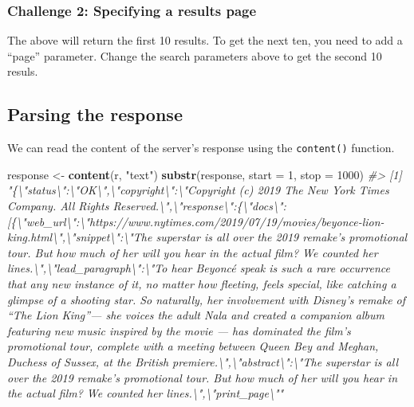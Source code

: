 \documentclass[]{book}
\newenvironment{Shaded}{\begin{snugshade}}{\end{snugshade}}
\newcommand{\KeywordTok}[1]{\textcolor[rgb]{0.13,0.29,0.53}{\textbf{#1}}}
\newcommand{\DataTypeTok}[1]{\textcolor[rgb]{0.13,0.29,0.53}{#1}}
\newcommand{\DecValTok}[1]{\textcolor[rgb]{0.00,0.00,0.81}{#1}}
\newcommand{\StringTok}[1]{\textcolor[rgb]{0.31,0.60,0.02}{#1}}
\newcommand{\CommentTok}[1]{\textcolor[rgb]{0.56,0.35,0.01}{\textit{#1}}}
\newcommand{\NormalTok}[1]{#1}
\begin{document}
\subsubsection*{Challenge 2: Specifying a results
page}\label{challenge-2-specifying-a-results-page}

The above will return the first 10 results. To get the next ten, you
need to add a ``page'' parameter. Change the search parameters above to
get the second 10 resuls.

\subsection{Parsing the response}\label{parsing-the-response}

We can read the content of the server's response using the
\texttt{content()} function.

\begin{Shaded}
\begin{Highlighting}[]
\NormalTok{response <-}\StringTok{ }\KeywordTok{content}\NormalTok{(r, }\StringTok{"text"}\NormalTok{)}
\KeywordTok{substr}\NormalTok{(response, }\DataTypeTok{start =} \DecValTok{1}\NormalTok{, }\DataTypeTok{stop =} \DecValTok{1000}\NormalTok{)}
\CommentTok{#> [1] "\{\textbackslash{}"status\textbackslash{}":\textbackslash{}"OK\textbackslash{}",\textbackslash{}"copyright\textbackslash{}":\textbackslash{}"Copyright (c) 2019 The New York Times Company. All Rights Reserved.\textbackslash{}",\textbackslash{}"response\textbackslash{}":\{\textbackslash{}"docs\textbackslash{}":[\{\textbackslash{}"web_url\textbackslash{}":\textbackslash{}"https://www.nytimes.com/2019/07/19/movies/beyonce-lion-king.html\textbackslash{}",\textbackslash{}"snippet\textbackslash{}":\textbackslash{}"The superstar is all over the 2019 remake’s promotional tour. But how much of her will you hear in the actual film? We counted her lines.\textbackslash{}",\textbackslash{}"lead_paragraph\textbackslash{}":\textbackslash{}"To hear Beyoncé speak is such a rare occurrence that any new instance of it, no matter how fleeting, feels special, like catching a glimpse of a shooting star. So naturally, her involvement with Disney’s remake of “The Lion King”— she voices the adult Nala and created a companion album featuring new music inspired by the movie — has dominated the film’s promotional tour, complete with a meeting between Queen Bey and Meghan, Duchess of Sussex,  at the British premiere.\textbackslash{}",\textbackslash{}"abstract\textbackslash{}":\textbackslash{}"The superstar is all over the 2019 remake’s promotional tour. But how much of her will you hear in the actual film? We counted her lines.\textbackslash{}",\textbackslash{}"print_page\textbackslash{}""}
\end{Highlighting}
\end{Shaded}
\end{document}
